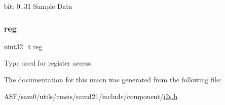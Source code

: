 bit\+: 0..31 Sample Data \mbox{\label{union_i2_s___d_a_t_a___type_a6b91636401516a477989a336376d7b40}} 
\subsubsection{\texorpdfstring{reg}{reg}}
{\footnotesize\ttfamily uint32\+\_\+t reg}

Type used for register access 

The documentation for this union was generated from the following file\+:\begin{DoxyCompactItemize}
\item 
A\+S\+F/sam0/utils/cmsis/samd21/include/component/\mbox{\hyperlink{component_2i2s_8h}{i2s.\+h}}\end{DoxyCompactItemize}

